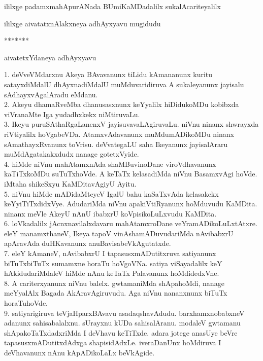 \documentclass{article}
\begin{document}
\begin{center}
ililxge padamxmahApurANada BUmiKaMDadalilx sukalAcariteyalilx
\end{center}

\begin{center}
ililxge aivatatxnAlakxneya adhAyxyavu mugidudu
\end{center}

\begin{center}
*******
\end{center}

\begin{center}
aivatetxYdaneya adhAyxyavu
\end{center}

1. deVveVMdarxnu Akeya BAvavanunx tiLidu kAmananunx kuritu satayxdiMdalU dhAyxnadiMdalU muMduvaridiruva A sukaleyanunx jayisalu sAdhayxvAgalAradu eMdanu.\\
2. Akeyu dhamaRveMba dhanusasxnunx keYyalilx hiDidukoMDu kobibxda viVranaMte Iga yudadhxkekx niMtiruvaLu.\\
3. Ikeyu puruSAthaRgaLanenxV jayisuvavaLAgiruvaLu. niVnu ninanx shwrayxda riVtiyalilx hoVgabeVDa. AtamxvAdavanunx muMdumADikoMDu ninanx sAmathayxRvanunx toVrisu. deVvategaLU saha Ikeyanunx jayisalAraru muMdAgatakakxdudx nanage gotetxVyide.\\
4. hiMde niVnu mahAtamxnAda shaMBuvinoDane viroVdhavanunx kaTiTxkoMDu suTuTxhoVde. A keTaTx kelasadiMda niVnu BasamxvAgi hoVde. iMtaha shikeSxyu KaMDitavAgiyU Ayitu.\\
5. niVnu hiMde mADidaMteyeV IgalU bahu kaSaTxvAda kelasakekx keYyiTiTxdidxVye. AdudariMda niVnu apakiVtiRyanunx hoMduvudu KaMDita. ninanx meVle AkeyU nAnU ibabxrU koVpisikoLuLxvudu KaMDita.\\
6. loVkadalilx jAcnxnavilalxdavaru mahAtamxroDane veYramADikoLuLxtAtxre. eleY manamxthaneV, Ikeya tapoV vinAshamADuvudariMda nAvibabxrU apAravAda duHKavanunx anuBavisabeVkAgutatxde.\\
7. eleY kAmaneV, nAvibabxrU I tapasusxmADutitxruva satiyanunx biTuTxbiTuTx sumamxne horaTu hoVgoVNa. satiya viSayadalilx keY hAkidudariMdaleV hiMde nAnu keTaTx Palavanunx hoMdidedxVne.\\
8. A cariterxyanunx niVnu balelx. gwtamaniMda shApahoMdi, nanage meYyalAlx Bagada AkAravAgiruvudu. Aga niVnu nananxnunx biTuTx horaTuhoVde.\\
9. satiyarigiruva teVjaHparxBAvavu asadaqshavAdudu. barxhamxnobabxneV adanunx sahisabalalxnu. sUrayxnu kUDa sahisalAranu. modaleV gwtamanu shApakoTaTxdadxriMda I deVhavu keTiTxde. adara jotege anasUye beVre tapasusxmADutitxdAdxga shapisidAdxLe. iveraDanUnx hoMdiruva I deVhavanunx nAnu kApADikoLaLx beVkAgide.\\
\end{document}
